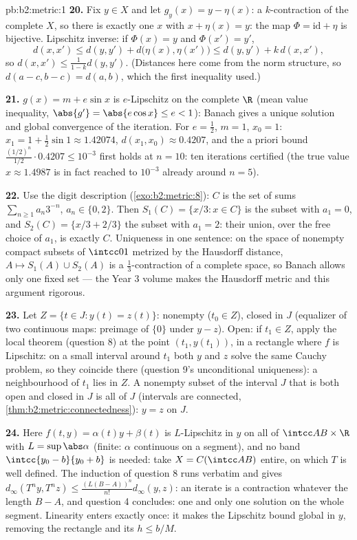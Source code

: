 \begin{solution}{pb:b2:metric:1}
\textbf{20.} Fix $y \in X$ and let $g_y(x) = y - \eta(x)$: a
$k$-contraction of the complete $X$, so there is exactly one $x$
with $x + \eta(x) = y$: the map $\Phi = \mathrm{id} + \eta$ is
bijective. Lipschitz inverse: if $\Phi(x) = y$ and $\Phi(x') =
y'$,
\[
d(x, x') \leq d(y, y') + d\bigl(\eta(x), \eta(x')\bigr)
\leq d(y, y') + k\,d(x, x'),
\]
so $d(x, x') \leq \frac{1}{1-k}d(y, y')$. (Distances here come
from the norm structure, so $d(a - c, b - c) = d(a, b)$, which
the first inequality used.)

\textbf{21.} $g(x) = m + e\sin x$ is $e$-Lipschitz on the
complete $\R$ (mean value inequality, $\abs{g'} = \abs{e\cos x}
\leq e < 1$): Banach gives a unique solution and global
convergence of the iteration. For $e = \frac12$, $m = 1$, $x_0
= 1$: $x_1 = 1 + \frac12\sin 1 \approx 1.42074$, $d(x_1, x_0)
\approx 0.4207$, and the a priori bound
$\frac{(1/2)^n}{1/2}\cdot 0.4207 \leq 10^{-3}$ first holds at
$n = 10$: ten iterations certified (the true value $x \approx
1.4987$ is in fact reached to $10^{-3}$ already around $n =
5$).

\textbf{22.} Use the digit description
(\cref{exo:b2:metric:8}): $C$ is the set of sums
$\sum_{n\geq1}a_n3^{-n}$, $a_n \in \{0, 2\}$. Then $S_1(C) =
\{x/3 : x \in C\}$ is the subset with $a_1 = 0$, and $S_2(C) =
\{x/3 + 2/3\}$ the subset with $a_1 = 2$: their union, over the
free choice of $a_1$, is exactly $C$. Uniqueness in one
sentence: on the space of nonempty compact subsets of
$\intcc01$ metrized by the Hausdorff distance, $A \mapsto
S_1(A) \cup S_2(A)$ is a $\frac13$-contraction of a complete
space, so Banach allows only one fixed set --- the Year 3
volume makes the Hausdorff metric and this argument rigorous.

\textbf{23.} Let $Z = \{t \in J : y(t) = z(t)\}$: nonempty
($t_0 \in Z$), closed in $J$ (equalizer of two continuous maps:
preimage of $\{0\}$ under $y - z$). Open: if $t_1 \in Z$, apply
the local theorem (question 8) at the point $(t_1, y(t_1))$,
in a rectangle where $f$ is Lipschitz: on a small interval
around $t_1$ both $y$ and $z$ solve the same Cauchy problem, so
they coincide there (question 9's unconditional uniqueness):
a neighbourhood of $t_1$ lies in $Z$. A nonempty subset of the
interval $J$ that is both open and closed in $J$ is all of $J$
(intervals are connected,
\cref{thm:b2:metric:connectedness}): $y = z$ on $J$.

\textbf{24.} Here $f(t, y) = \alpha(t)y + \beta(t)$ is
$L$-Lipschitz in $y$ on all of $\intcc AB \times \R$ with $L =
\sup\abs\alpha$ (finite: $\alpha$ continuous on a segment), and
no band $\intcc{y_0 - b}{y_0 + b}$ is needed: take $X = C(\intcc
AB)$ entire, on which $T$ is well defined. The induction of
question 8 runs verbatim and gives $d_\infty(T^ny, T^nz) \leq
\frac{(L(B - A))^n}{n!}d_\infty(y, z)$: an iterate is a
contraction whatever the length $B - A$, and question 4
concludes: one and only one solution on the whole segment.
Linearity enters exactly once: it makes the Lipschitz bound
global in $y$, removing the rectangle and its $h \leq b/M$.


\end{solution}
